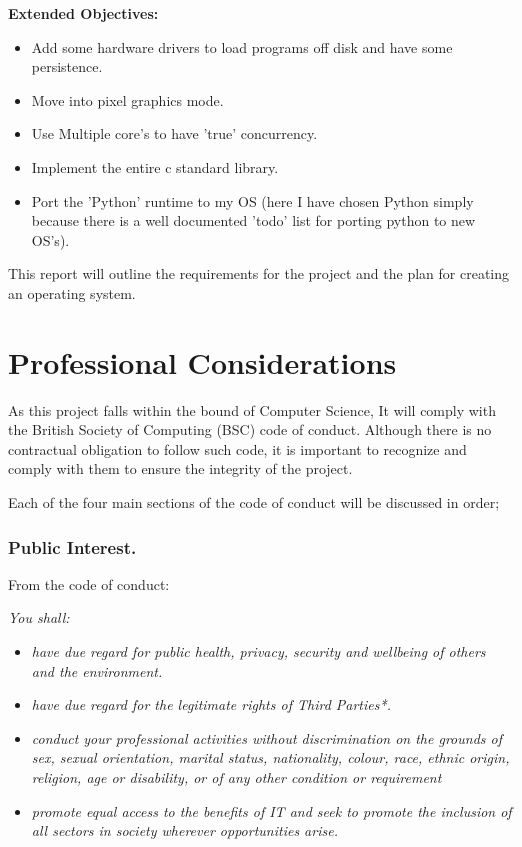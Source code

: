 \documentclass[a4paper]{report}
\begin{document}
\textbf {Extended Objectives:}


\begin{itemize}
\item Add some hardware drivers to load programs off disk and have some persistence.
\item Move into pixel graphics mode.
\item Use Multiple core's to have 'true' concurrency.
\item Implement the entire c standard library.
\item Port the 'Python' runtime to my OS (here I have chosen Python simply because there is a well documented 'todo' list for porting python to new OS's).
\end{itemize}



This report will outline the requirements for the project and the plan for creating an operating system.

\chapter*{Professional Considerations}

As this project falls within the bound of Computer Science, It will comply with the British Society of Computing (BSC) code of conduct. Although there is no contractual obligation to follow such code, it is important to recognize and comply with them to ensure the integrity of the project.

Each of the four main sections of the code of conduct will be discussed in order;

\subsection*{Public Interest.}

From the code of conduct: \cite{CoC}

\textit{You shall:}
\begin{itemize}
\item \textit{have due regard for public health, privacy, security and wellbeing of others and the environment.}
\item \textit{have due regard for the legitimate rights of Third Parties*.}
\item \textit{conduct your professional activities without discrimination on the grounds of sex, sexual orientation, marital status, nationality, colour, race, ethnic origin, religion, age or disability, or of any other condition or requirement }
\item \textit{promote equal access to the benefits of IT and seek to promote the inclusion of all sectors in society wherever opportunities arise.}
\end{itemize}
\end{document}
